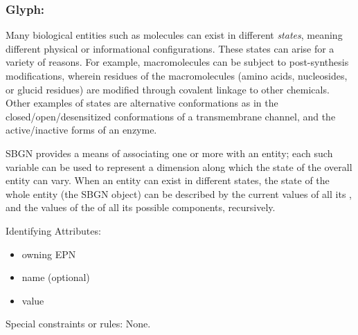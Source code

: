 
\subsubsection{Glyph: }
\label{sec:stateVariable}

Many biological entities such as molecules can exist in different \emph{states}, meaning different physical or informational configurations.  These states can arise for a variety of reasons.  For example, macromolecules can be subject to post-synthesis modifications, wherein residues of the macromolecules (amino acids, nucleosides, or glucid residues) are modified through covalent linkage to other chemicals.  Other examples of states are alternative conformations as in the closed/open/desensitized conformations of a transmembrane channel, and the active/inactive forms of an enzyme.

SBGN provides a means of associating one or more  with an entity; each such variable can be used to represent a dimension along which the state of the overall entity can vary.  When an entity can exist in different states, the state of the whole entity (\ie the SBGN object) can be described by the current values of all its , and the values of the  of all its possible components, recursively.

\begin{glyphDescription}
\item[Identifying Attributes:]\mbox{}
  \begin{itemize}
  \item owning EPN
  \item name (optional)
  \item value
 \end{itemize}
\item[Special constraints or rules:]\mbox{}\newline None.
\end{glyphDescription}

